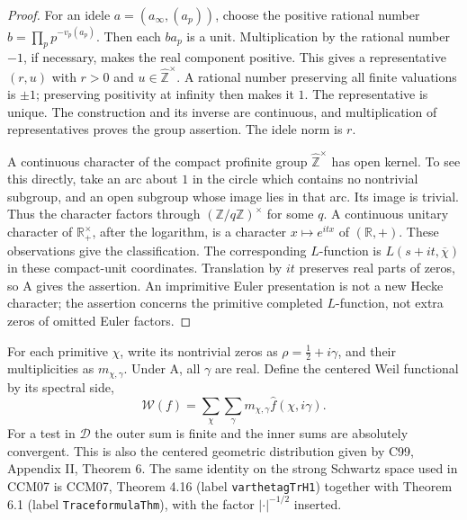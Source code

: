 \begin{proof}
For an idele \(a=(a_\infty,(a_p))\), choose the positive rational
number \(b=\prod_p p^{-v_p(a_p)}\). Then each \(ba_p\) is a unit.
Multiplication by the rational number \(-1\), if necessary, makes
the real component positive. This gives a representative
\((r,u)\) with \(r>0\) and \(u\in\widehat{\mathbb Z}^{\times}\).
A rational number preserving all finite valuations is \(\pm1\);
preserving positivity at infinity then makes it \(1\). The
representative is unique. The construction and its inverse are
continuous, and multiplication of representatives proves the
group assertion. The idele norm is \(r\).

A continuous character of the compact profinite group
\(\widehat{\mathbb Z}^{\times}\) has open kernel. To see this
directly, take an arc about \(1\) in the circle which contains no
nontrivial subgroup, and an open subgroup whose image lies in that
arc. Its image is trivial. Thus the character factors through
\((\mathbb Z/q\mathbb Z)^\times\) for some \(q\).
A continuous unitary character of \(\mathbb R_+^\times\), after
the logarithm, is a character \(x\mapsto e^{itx}\) of
\((\mathbb R,+)\). These observations give the classification.
The corresponding \(L\)-function is \(L(s+it,\overline\chi)\)
in these compact-unit coordinates.
Translation by \(it\) preserves real parts of zeros, so A gives
the assertion. An imprimitive Euler presentation is not a new
Hecke character; the assertion concerns the primitive completed
\(L\)-function, not extra zeros of omitted Euler factors.
\end{proof}

For each primitive \(\chi\), write its nontrivial zeros as
\(\rho=\frac12+i\gamma\), and their multiplicities as \(m_{\chi,\gamma}\).
Under A, all \(\gamma\) are real. Define the centered Weil
functional by its spectral side,
\[
 \mathcal W(f)=
 \sum_{\chi}\sum_\gamma m_{\chi,\gamma}
       \widehat f(\chi,i\gamma).                         \tag{T.1}
\]
For a test in \(\mathcal D\) the outer sum is finite and the inner
sums are absolutely convergent. This is also the centered
geometric distribution given by C99, Appendix II, Theorem 6.
The same identity on the strong Schwartz space used in CCM07 is
CCM07, Theorem 4.16 (label \texttt{varthetagTrH1}) together with
Theorem 6.1 (label \texttt{TraceformulaThm}), with the factor
\(|\cdot|^{-1/2}\) inserted.

